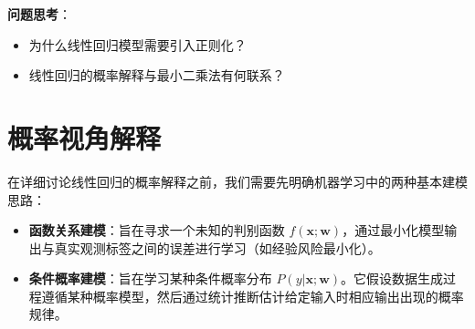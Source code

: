 \documentclass{article}
\theoremstyle{remark}
\theoremstyle{definition}
\theoremstyle{plain}
\numberwithin {equation}{section}
\numberwithin{assumption}{section}
\begin{document}
\textbf{问题思考}：
\begin{itemize}
    \item 为什么线性回归模型需要引入正则化？
    \item 线性回归的概率解释与最小二乘法有何联系？
\end{itemize}
    

\section{概率视角解释}

在详细讨论线性回归的概率解释之前，我们需要先明确机器学习中的两种基本建模思路：
\begin{itemize}
    \item \textbf{函数关系建模}：旨在寻求一个未知的判别函数 $f(\boldsymbol{x}; \boldsymbol{w})$，通过最小化模型输出与真实观测标签之间的误差进行学习（如经验风险最小化）。
    \item \textbf{条件概率建模}：旨在学习某种条件概率分布 $P(y|\boldsymbol{x}; \boldsymbol{w})$。它假设数据生成过程遵循某种概率模型，然后通过统计推断估计给定输入时相应输出出现的概率规律。
\end{itemize}
\end{document}
